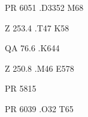 \documentclass[letterpaper,10pt]{article}
\begin{document}
\begin{labels}%
\begin{center}%
\parbox{20mm}{%
PR
6051
.D3352
M68}\end{center}

\begin{center}%
\parbox{20mm}{%
Z
253.4
.T47
K58}\end{center}

\begin{center}%
\parbox{20mm}{%
QA
76.6
.K644}\end{center}

\begin{center}%
\parbox{20mm}{%
Z
250.8
.M46
E578}\end{center}

\begin{center}%
\parbox{20mm}{%
PR
5815}\end{center}

\begin{center}%
\parbox{20mm}{%
PR
6039
.O32
T65}\end{center}

\end{labels}
\end{document}
